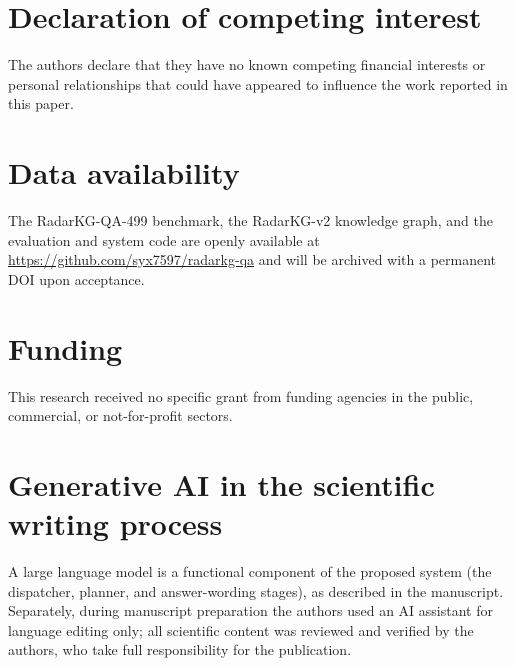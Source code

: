 \documentclass[review]{elsarticle}
\begin{document}
\section*{Declaration of competing interest}
The authors declare that they have no known competing financial interests or personal relationships that could have appeared to influence the work reported in this paper.

\section*{Data availability}
The RadarKG-QA-499 benchmark, the RadarKG-v2 knowledge graph, and the evaluation and system code are openly available at \url{https://github.com/syx7597/radarkg-qa} and will be archived with a permanent DOI upon acceptance.

\section*{Funding}
This research received no specific grant from funding agencies in the public, commercial, or not-for-profit sectors.

\section*{Generative AI in the scientific writing process}
A large language model is a functional component of the proposed system (the dispatcher, planner, and answer-wording stages), as described in the manuscript. Separately, during manuscript preparation the authors used an AI assistant for language editing only; all scientific content was reviewed and verified by the authors, who take full responsibility for the publication.



\end{document}
